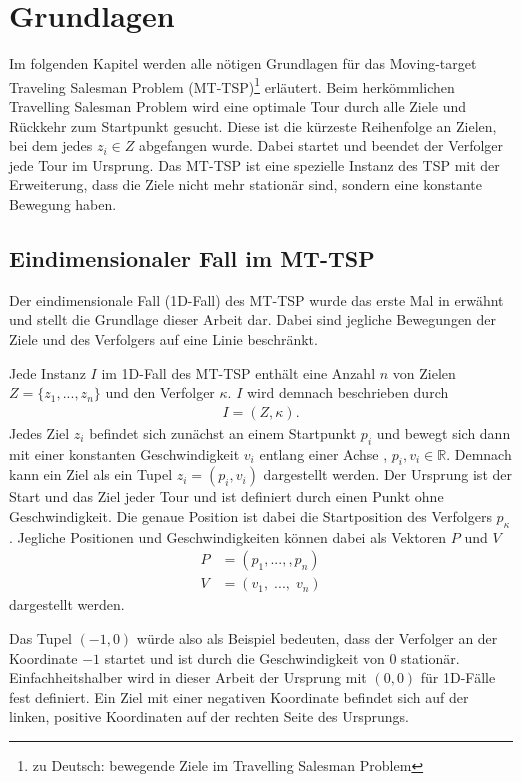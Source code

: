 \documentclass[german,version-2019-11]{uzl-thesis}
\begin{document}

\chapter{Grundlagen}
\label{chapter-use}
Im folgenden Kapitel werden alle nötigen Grundlagen für das Moving-target Traveling Salesman Problem (MT-TSP)\footnote{zu Deutsch: bewegende Ziele im Travelling Salesman Problem} erläutert. Beim herkömmlichen Travelling Salesman Problem wird eine optimale Tour durch alle Ziele und Rückkehr zum Startpunkt gesucht. Diese ist die kürzeste Reihenfolge an Zielen, bei dem jedes $z_i\in Z$ abgefangen wurde. Dabei startet und beendet der Verfolger jede Tour im Ursprung. Das MT-TSP ist eine spezielle Instanz des TSP mit der Erweiterung, dass die Ziele nicht mehr stationär sind, sondern eine konstante Bewegung haben.


\section{Eindimensionaler Fall im MT-TSP}
Der eindimensionale Fall (1D-Fall) des MT-TSP wurde das erste Mal in \cite{helvig} erwähnt und stellt die Grundlage dieser Arbeit dar. Dabei sind jegliche Bewegungen der Ziele und des Verfolgers auf eine Linie beschränkt. 
\begin{definition} 
\label{def:Instanz}
Jede Instanz $I$ im 1D-Fall des MT-TSP enthält eine Anzahl $n$ von Zielen $Z = \{z_1,...,z_n\}$ und den Verfolger $\kappa$. $I$ wird demnach beschrieben durch
\begin{align*}
I = (Z, \kappa).
\end{align*}
Jedes Ziel $z_i$ befindet sich zunächst an einem Startpunkt $p_i$ und bewegt sich dann mit einer konstanten Geschwindigkeit $v_i$ entlang einer Achse , $p_i, v_i \in\mathbb{R}$. Demnach kann ein Ziel als ein Tupel $z_i = (p_i, v_i)$ dargestellt werden. Der Ursprung ist der Start und das Ziel jeder Tour und ist definiert durch einen Punkt ohne Geschwindigkeit. Die genaue Position ist dabei die Startposition des Verfolgers $p_{\kappa}$. Jegliche Positionen und Geschwindigkeiten können dabei als Vektoren $P$ und $V$ 
\begin{align*}
P &= (p_1, ..., ,p_n)\\
V &= (v_1,\; ...,\; v_n)
\end{align*}\newpage\noindent
dargestellt werden.
\end{definition}\noindent
Das Tupel $(-1,0)$ würde also als Beispiel bedeuten, dass der Verfolger an der Koordinate $-1$ startet und ist durch die Geschwindigkeit von $0$ stationär. Einfachheitshalber wird in dieser Arbeit der Ursprung mit $(0,0)$ für 1D-Fälle fest definiert. Ein Ziel mit einer negativen Koordinate befindet sich auf der linken, positive Koordinaten auf der rechten Seite des Ursprungs. 
\end{document}
